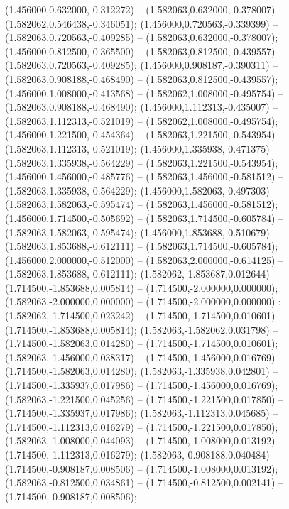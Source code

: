  (1.456000,0.632000,-0.312272) -- (1.582063,0.632000,-0.378007) -- (1.582062,0.546438,-0.346051);
 (1.456000,0.720563,-0.339399) -- (1.582063,0.720563,-0.409285) -- (1.582063,0.632000,-0.378007);
 (1.456000,0.812500,-0.365500) -- (1.582063,0.812500,-0.439557) -- (1.582063,0.720563,-0.409285);
 (1.456000,0.908187,-0.390311) -- (1.582063,0.908188,-0.468490) -- (1.582063,0.812500,-0.439557);
 (1.456000,1.008000,-0.413568) -- (1.582062,1.008000,-0.495754) -- (1.582063,0.908188,-0.468490);
 (1.456000,1.112313,-0.435007) -- (1.582063,1.112313,-0.521019) -- (1.582062,1.008000,-0.495754);
 (1.456000,1.221500,-0.454364) -- (1.582063,1.221500,-0.543954) -- (1.582063,1.112313,-0.521019);
 (1.456000,1.335938,-0.471375) -- (1.582063,1.335938,-0.564229) -- (1.582063,1.221500,-0.543954);
 (1.456000,1.456000,-0.485776) -- (1.582063,1.456000,-0.581512) -- (1.582063,1.335938,-0.564229);
 (1.456000,1.582063,-0.497303) -- (1.582063,1.582063,-0.595474) -- (1.582063,1.456000,-0.581512);
 (1.456000,1.714500,-0.505692) -- (1.582063,1.714500,-0.605784) -- (1.582063,1.582063,-0.595474);
 (1.456000,1.853688,-0.510679) -- (1.582063,1.853688,-0.612111) -- (1.582063,1.714500,-0.605784);
 (1.456000,2.000000,-0.512000) -- (1.582063,2.000000,-0.614125) -- (1.582063,1.853688,-0.612111);
 (1.582062,-1.853687,0.012644) -- (1.714500,-1.853688,0.005814) -- (1.714500,-2.000000,0.000000);
 (1.582063,-2.000000,0.000000) -- (1.714500,-2.000000,0.000000) ;
 (1.582062,-1.714500,0.023242) -- (1.714500,-1.714500,0.010601) -- (1.714500,-1.853688,0.005814);
 (1.582063,-1.582062,0.031798) -- (1.714500,-1.582063,0.014280) -- (1.714500,-1.714500,0.010601);
 (1.582063,-1.456000,0.038317) -- (1.714500,-1.456000,0.016769) -- (1.714500,-1.582063,0.014280);
 (1.582063,-1.335938,0.042801) -- (1.714500,-1.335937,0.017986) -- (1.714500,-1.456000,0.016769);
 (1.582063,-1.221500,0.045256) -- (1.714500,-1.221500,0.017850) -- (1.714500,-1.335937,0.017986);
 (1.582063,-1.112313,0.045685) -- (1.714500,-1.112313,0.016279) -- (1.714500,-1.221500,0.017850);
 (1.582063,-1.008000,0.044093) -- (1.714500,-1.008000,0.013192) -- (1.714500,-1.112313,0.016279);
 (1.582063,-0.908188,0.040484) -- (1.714500,-0.908187,0.008506) -- (1.714500,-1.008000,0.013192);
 (1.582063,-0.812500,0.034861) -- (1.714500,-0.812500,0.002141) -- (1.714500,-0.908187,0.008506);
